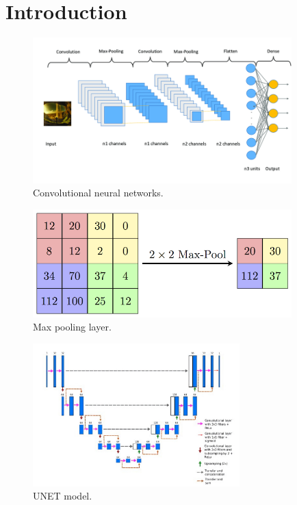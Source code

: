 \titleframe

\section{Introduction}

\begin{frame}{\insertsectionhead}
  \begin{figure}[H]
    \includegraphics[width=10cm]{Graphics/convolutional.png}
    \caption{Convolutional neural networks\cite{Garcia_2020}.}
  \end{figure}
\end{frame}

\begin{frame}{\insertsectionhead}
  \begin{figure}[H]
    \includegraphics[width=10cm]{Graphics/max_pooling.png}
    \caption{Max pooling layer.}
  \end{figure}
\end{frame}

\begin{frame}{\insertsectionhead}
  \begin{figure}[H]
    \includegraphics[width=8cm]{Graphics/unet_model.jpg}
    \caption{UNET model\cite{Sevastopolsky_2018}.}
  \end{figure}
\end{frame}


